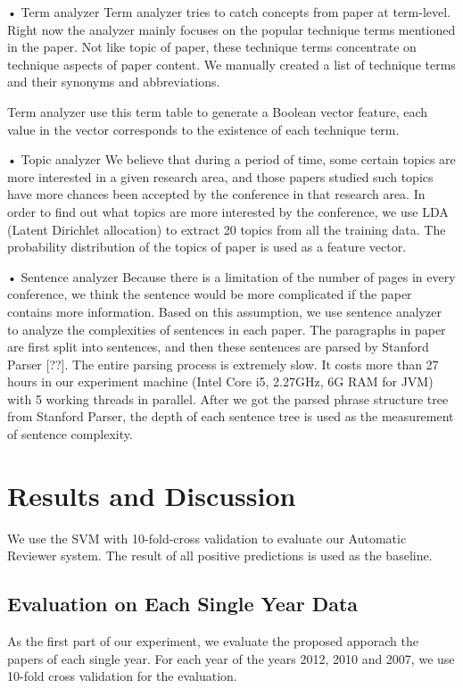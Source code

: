 \documentclass[11pt,letterpaper]{article}
\begin{document}
•	Term analyzer
Term analyzer tries to catch concepts from paper at term-level. Right now the analyzer mainly focuses on the popular technique terms mentioned in the paper. Not like topic of paper, these technique terms concentrate on technique aspects of paper content. We manually created a list of technique terms and their synonyms and abbreviations. 

Term analyzer use this term table to generate a Boolean vector feature, each value in the vector corresponds to the existence of each technique term. 


•	Topic analyzer
We believe that during a period of time, some certain topics are more interested in a given research area, and those papers studied such topics have more chances been accepted by the conference in that research area. In order to find out what topics are more interested by the conference, we use LDA (Latent Dirichlet allocation) to extract 20 topics from all the training data. The probability distribution of the topics of paper is used as a feature vector.  

•	Sentence analyzer
Because there is a limitation of the number of pages in every conference, we think the sentence would be more complicated if the paper contains more information. Based on this assumption, we use sentence analyzer to analyze the complexities of sentences in each paper. The paragraphs in paper are first split into sentences, and then these sentences are parsed by Stanford Parser [??]. The entire parsing process is extremely slow. It costs more than 27 hours in our experiment machine (Intel Core i5, 2.27GHz, 6G RAM for JVM) with 5 working threads in parallel. After we got the parsed phrase structure tree from Stanford Parser, the depth of each sentence tree is used as the measurement of sentence complexity. 










\section{Results and Discussion}
We use the SVM with 10-fold-cross validation to evaluate our Automatic Reviewer system. The result of all positive predictions is used as the baseline. 


\subsection{Evaluation on Each Single Year Data}
As the first part of our experiment, 
we evaluate the proposed apporach the papers of each single year.
For each year of the years 2012, 2010 and 2007, 
we use 10-fold cross validation for the evaluation.
\end{document}
